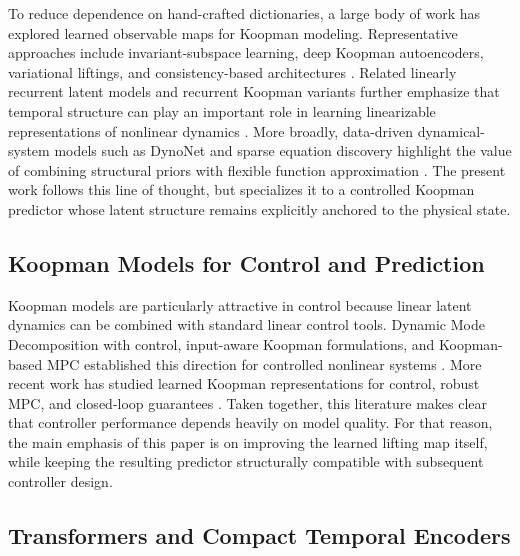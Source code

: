 \documentclass[journal]{IEEEtran}
\begin{document}
To reduce dependence on hand-crafted dictionaries, a large body of work has explored learned observable maps for Koopman modeling. Representative approaches include invariant-subspace learning, deep Koopman autoencoders, variational liftings, and consistency-based architectures \cite{takeishi2017koopman, yeung2019learning, lusch2018deep, morton2019deep, azencot2020forecasting, yuan2022variational}. Related linearly recurrent latent models and recurrent Koopman variants further emphasize that temporal structure can play an important role in learning linearizable representations of nonlinear dynamics \cite{otto2019linearly, rank2019recurrent}. More broadly, data-driven dynamical-system models such as DynoNet and sparse equation discovery highlight the value of combining structural priors with flexible function approximation \cite{forgione2021dynonet, brunton2016sindy}. The present work follows this line of thought, but specializes it to a controlled Koopman predictor whose latent structure remains explicitly anchored to the physical state.

\subsection{Koopman Models for Control and Prediction}

Koopman models are particularly attractive in control because linear latent dynamics can be combined with standard linear control tools. Dynamic Mode Decomposition with control, input-aware Koopman formulations, and Koopman-based MPC established this direction for controlled nonlinear systems \cite{proctor2016dmdc, proctor2018generalizing, brunton2016invariant, korda2018linear}. More recent work has studied learned Koopman representations for control, robust MPC, and closed-loop guarantees \cite{han2020deep, shi2022deep, strasser2026overview, duran2025control}. Taken together, this literature makes clear that controller performance depends heavily on model quality. For that reason, the main emphasis of this paper is on improving the learned lifting map itself, while keeping the resulting predictor structurally compatible with subsequent controller design.

\subsection{Transformers and Compact Temporal Encoders}
\end{document}
